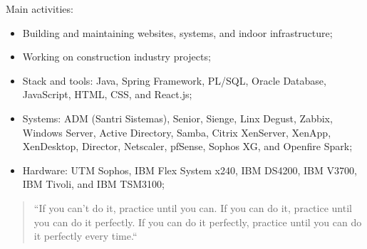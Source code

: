 \documentclass[10pt,a4paper,ragged2e,withhyper]{assets/class/altacv}
\begin{document}
\begin{paracol}{2}
  Main activities:
  \begin{itemize}
    \item Building and maintaining websites, systems, and indoor infrastructure;
    \item Working on construction industry projects;
    \item Stack and tools: Java, Spring Framework, PL/SQL, Oracle Database, JavaScript, HTML, CSS, and React.js;
    \item Systems: ADM (Santri Sistemas), Senior, Sienge, Linx Degust, Zabbix, Windows Server, Active Directory, Samba, Citrix XenServer, XenApp, XenDesktop, Director, Netscaler, pfSense, Sophos XG, and Openfire Spark;
    \item Hardware: UTM Sophos, IBM Flex System x240, IBM DS4200, IBM V3700, IBM Tivoli, and IBM TSM3100;
  \end{itemize}



  \switchcolumn



  \begin{quote}
    ``If you can't do it, practice until you can. If you can do it, practice until you can do it perfectly. If you can do it perfectly, practice until you can do it perfectly every time.``
  \end{quote}

  \medskip



  \medskip


  \\

  \divider\smallskip


\end{paracol}
\end{document}
